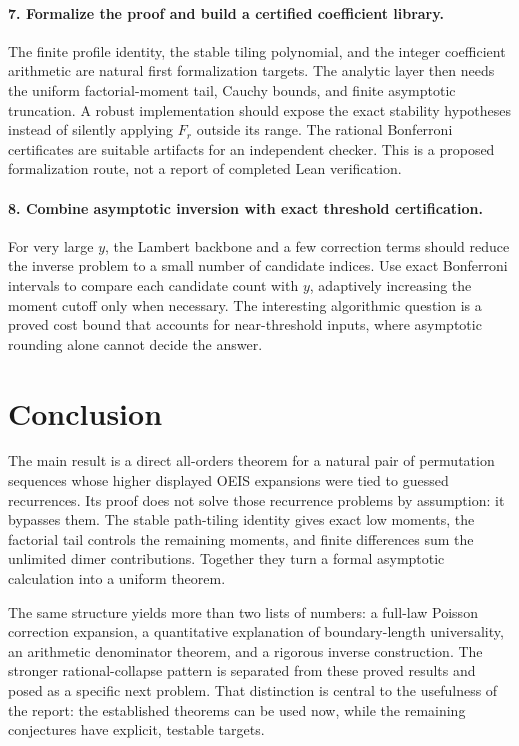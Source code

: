 \documentclass[11pt]{article}
\numberwithin{equation}{section}
\theoremstyle{definition}
\theoremstyle{remark}
\theoremstyle{definition}
\begin{document}
\paragraph{7. Formalize the proof and build a certified coefficient library.}
The finite profile identity, the stable tiling polynomial, and the integer
coefficient arithmetic are natural first formalization targets. The analytic
layer then needs the uniform factorial-moment tail, Cauchy bounds, and finite
asymptotic truncation. A robust implementation should expose the exact
stability hypotheses instead of silently applying $F_r$ outside its range.
The rational Bonferroni certificates are suitable artifacts for an independent
checker. This is a proposed formalization route, not a report of completed
Lean verification.

\paragraph{8. Combine asymptotic inversion with exact threshold certification.}
For very large $y$, the Lambert backbone and a few correction terms should
reduce the inverse problem to a small number of candidate indices. Use exact
Bonferroni intervals to compare each candidate count with $y$, adaptively
increasing the moment cutoff only when necessary. The interesting algorithmic
question is a proved cost bound that accounts for near-threshold inputs,
where asymptotic rounding alone cannot decide the answer.

\section{Conclusion}

The main result is a direct all-orders theorem for a natural pair of
permutation sequences whose higher displayed OEIS expansions were tied to
guessed recurrences. Its proof does not solve those recurrence problems by
assumption: it bypasses them. The stable path-tiling identity gives exact low
moments, the factorial tail controls the remaining moments, and finite
differences sum the unlimited dimer contributions. Together they turn a formal
asymptotic calculation into a uniform theorem.

The same structure yields more than two lists of numbers: a full-law
Poisson correction expansion, a quantitative explanation of boundary-length
universality, an arithmetic denominator theorem, and a rigorous inverse
construction. The stronger rational-collapse pattern is separated from these
proved results and posed as a specific next problem. That distinction is
central to the usefulness of the report: the established theorems can be
used now, while the remaining conjectures have explicit, testable targets.
\end{document}
